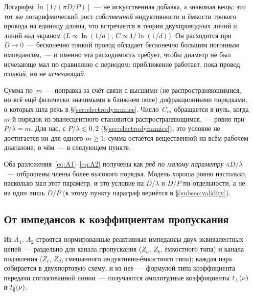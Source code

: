 \begin{intuition}
Логарифм $\ln[1/(\pi D/P)]$~--- не искусственная добавка, а знакомая вещь: это тот же
логарифмический рост \emph{собственной} индуктивности и ёмкости тонкого провода на единицу длины,
что встречается в теории двухпроводных линий и линий над экраном ($L\propto\ln(1/d)$,
$C\propto1/\ln(1/d)$). Он расходится при $D\to0$~--- бесконечно тонкий провод обладает
бесконечно большим погонным импедансом,~--- и именно эта расходимость требует, чтобы диаметр не
был исчезающе мал по сравнению с периодом: приближение работает, пока провод \emph{тонкий}, но
не \emph{исчезающий}.

Сумма по~$m$~--- поправка за счёт связи с высшими (не распространяющимися, но всё ещё
физически значимыми в ближнем поле) дифракционными порядками, о которых шла речь в
§\ref{sec:electrodynamics}. Число~$C_m$ обращается в нуль, когда $m$-й порядок из эванесцентного
становится распространяющимся,~--- ровно при $P/\lambda=m$. Для нас, с $P/\lambda\lesssim0{,}2$
(§\ref{sec:electrodynamics}), это условие не достигается ни для одного $m\ge1$: сумма остаётся
вещественной на всём рабочем диапазоне, о чём~--- в следующем пункте.
\end{intuition}

\begin{warning}
Оба разложения~\eqref{eq:A1}--\eqref{eq:A2} получены как \emph{ряд по малому параметру}
$\pi D/\lambda$~--- отброшены члены более высокого порядка. Модель хороша ровно настолько,
насколько мал этот параметр, и это условие на $D/\lambda$ и $D/P$ по отдельности, а не на один лишь
$D/P$ (к этому пункту параграф вернётся в §\ref{subsec:validity}).
\end{warning}

\subsection{От импедансов к коэффициентам пропускания}
\label{subsec:transmission}

Из $A_1$, $A_2$ строятся нормированные реактивные импедансы двух эквивалентных цепей~---
раздельно для канала пропускания ($Z_a$, $Z_b$, ёмкостного типа) и канала подавления ($Z_c$, $Z_d$,
смешанного индуктивно-ёмкостного типа); каждая пара собирается в двухпортовую схему, и из неё~---
формулой типа коэффициента передачи согласованной линии~--- получаются амплитудные коэффициенты
$t_{\perp}(\nu)$ и $t_{\parallel}(\nu)$.


